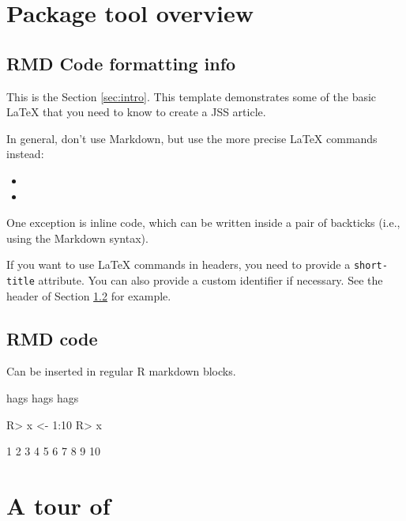 \documentclass[
  shortnames]{jss}
\begin{document}
\section[Package overview]{Package tool overview}\label{sec:overview}

\hypertarget{rmd-code-formatting-info}{%
\subsection{RMD Code formatting info}\label{rmd-code-formatting-info}}

This is the Section \ref{sec:intro}. This template demonstrates some of
the basic LaTeX that you need to know to create a JSS article.

In general, don't use Markdown, but use the more precise LaTeX commands
instead:

\begin{itemize}
\item
\item
\end{itemize}

One exception is inline code, which can be written inside a pair of
backticks (i.e., using the Markdown syntax).

If you want to use LaTeX commands in headers, you need to provide a
\texttt{short-title} attribute. You can also provide a custom identifier
if necessary. See the header of Section \ref{r-code} for example.

\subsection[R code]{RMD  code}\label{r-code}

Can be inserted in regular R markdown blocks.

hags hags hags \cite{Neal2004}

\begin{CodeChunk}
\begin{CodeInput}
R> x <- 1:10
R> x
\end{CodeInput}
\begin{CodeOutput}
 [1]  1  2  3  4  5  6  7  8  9 10
\end{CodeOutput}
\end{CodeChunk}

\section[Tour]{A tour of }\label{sec:tour}
\end{document}
